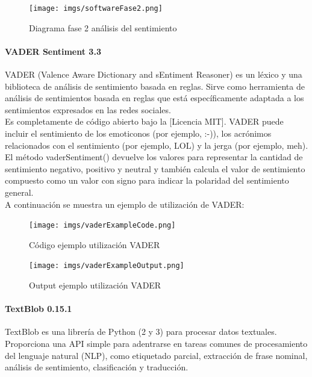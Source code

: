 \documentclass[../all.tex]{subfiles}
\begin{document}
        \begin{figure}[H]
        	\centering
        	\texttt{[image: imgs/softwareFase2.png]}
        	\caption{Diagrama fase 2 análisis del sentimiento}
        \end{figure}
    
    	\newpage
        \paragraph{VADER Sentiment 3.3}
        
        	VADER (Valence Aware Dictionary and sEntiment Reasoner) es un léxico y una biblioteca de análisis de sentimiento basada en reglas. Sirve como herramienta de análisis de sentimientos basada en reglas que está específicamente adaptada a los sentimientos expresados en las redes sociales.\\
        	
        	 Es completamente de código abierto bajo la [Licencia MIT]. VADER puede incluir el sentimiento de los emoticonos (por ejemplo, :-)), los acrónimos relacionados con el sentimiento (por ejemplo, LOL) y la jerga (por ejemplo, meh).\\
        	 
        	 El método vaderSentiment() devuelve los valores para representar la cantidad de sentimiento negativo, positivo y neutral y también calcula el valor de sentimiento compuesto como un valor con signo para indicar la polaridad del sentimiento general.\\
        	 
        	 A continuación se muestra un ejemplo de utilización de VADER:
        	 \begin{figure}[H]
        	 	\centering
        	 	\texttt{[image: imgs/vaderExampleCode.png]}
        	 	\caption{Código ejemplo utilización VADER}
        	 \end{figure}
        	\begin{figure}[H]
        		\centering
        		\texttt{[image: imgs/vaderExampleOutput.png]}
        		\caption{Output ejemplo utilización VADER}
        	\end{figure}
        
		\newpage
        \paragraph{TextBlob 0.15.1}
        	TextBlob es una librería de Python (2 y 3) para procesar datos textuales. Proporciona una API simple para adentrarse en tareas comunes de procesamiento del lenguaje natural (NLP), como etiquetado parcial, extracción de frase nominal, análisis de sentimiento, clasificación y traducción\cite{TextBlob}.\\
        	
\end{document}
